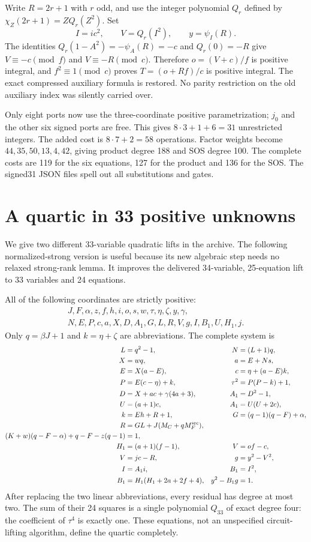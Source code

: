 \documentclass[11pt]{article}
\begin{document}
Write $R=2r+1$ with $r$ odd, and use the integer polynomial $Q_r$ defined by $\chi_Z(2r+1)=ZQ_r(Z^2)$. Set
\[
I=ic^2,\qquad V=Q_r(I^2),\qquad y=\psi_I(R).
\]
The identities $Q_r(1-A^2)=-\psi_A(R)=-c$ and $Q_r(0)=-R$ give
$V\equiv-c\pmod f$ and $V\equiv-R\pmod c$. Therefore $o=(V+c)/f$ is positive integral, and $f^2\equiv1\pmod c$ proves $T=(o+Rf)/c$ is positive integral. The exact compressed auxiliary formula is restored. No parity restriction on the old auxiliary index was silently carried over.

Only eight ports now use the three-coordinate positive parametrization; $j_0$ and the other six signed ports are free. This gives $8\cdot3+1+6=31$ unrestricted integers. The added cost is $8\cdot7+2=58$ operations. Factor weights become $44,35,50,13,4,42$, giving product degree 188 and SOS degree 100. The complete costs are 119 for the six equations, 127 for the product and 136 for the SOS. The signed31 JSON files spell out all substitutions and gates.

\section{A quartic in 33 positive unknowns}
We give two different 33-variable quadratic lifts in the archive. The following normalized-strong version is useful because its new algebraic step needs no relaxed strong-rank lemma. It improves the delivered 34-variable, 25-equation lift to 33 variables and 24 equations.

All of the following coordinates are strictly positive:
\begin{gather*}
J,F,\alpha,z,f,h,i,o,s,w,\tau,\eta,\zeta,y,\gamma,\\
N,E,P,c,a,X,D,A_1,G,L,R,V,g,I,B_1,U,H_1,j.
\end{gather*}
Only $q=\beta J+1$ and $k=\eta+\zeta$ are abbreviations. The complete system is
\begin{align*}
L&=q^2-1,&N&=(L+1)q,\\
X&=wq,&a&=E+Ns,\\
E&=X(a-E),&c&=\eta+(a-E)k,\\
P&=E(c-\eta)+k,&\tau^2&=P(P-k)+1,\\
D&=X+ac+\gamma(4a+3),&A_1&=D^2-1,\\
U&=(a+1)c,&A_1&=U(U+2c),\\
k&=Eh+R+1,&G&=(q-1)(q-F)+\alpha,\\
R&=GL+J(M_C+qM_F^{\rm src}),&&\\
(K+w)(q-F-\alpha)+q-F-z(q-1)&=1,&&\\
H_1&=(a+1)(f-1),&V&=of-c,\\
V&=jc-R,&g&=y^2-V^2,\\
I&=A_1i,&B_1&=I^2,\\
B_1&=H_1(H_1+2a+2f+4),&y^2-B_1g&=1.
\end{align*}
After replacing the two linear abbreviations, every residual has degree at most two. The sum of their 24 squares is a single polynomial $Q_{33}$ of exact degree four: the coefficient of $\tau^4$ is exactly one. These equations, not an unspecified circuit-lifting algorithm, define the quartic completely.
\end{document}
